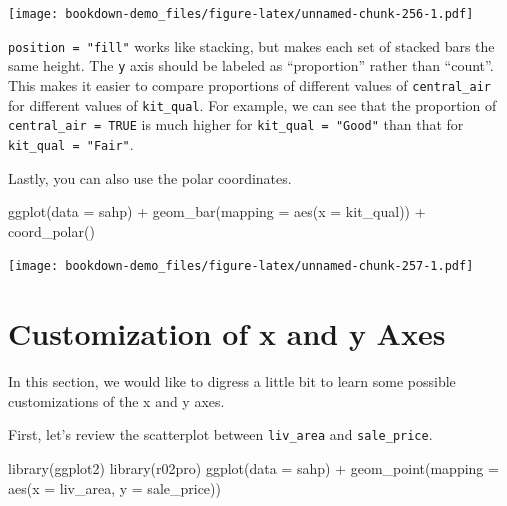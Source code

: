 \documentclass[
]{book}
\newenvironment{Shaded}{\begin{snugshade}}{\end{snugshade}}
\newcommand{\AttributeTok}[1]{\textcolor[rgb]{0.77,0.63,0.00}{#1}}
\newcommand{\FunctionTok}[1]{\textcolor[rgb]{0.00,0.00,0.00}{#1}}
\newcommand{\NormalTok}[1]{#1}
\newcommand{\SpecialCharTok}[1]{\textcolor[rgb]{0.00,0.00,0.00}{#1}}
\begin{document}
\texttt{[image: bookdown-demo\_files/figure-latex/unnamed-chunk-256-1.pdf]}

\texttt{position\ =\ "fill"} works like stacking, but makes each set of stacked bars the same height. The \texttt{y} axis should be labeled as ``proportion'' rather than ``count''. This makes it easier to compare proportions of different values of \texttt{central\_air} for different values of \texttt{kit\_qual}. For example, we can see that the proportion of \texttt{central\_air\ =\ TRUE} is much higher for \texttt{kit\_qual\ =\ "Good"} than that for \texttt{kit\_qual\ =\ "Fair"}.

Lastly, you can also use the polar coordinates.

\begin{Shaded}
\begin{Highlighting}[]
\FunctionTok{ggplot}\NormalTok{(}\AttributeTok{data =}\NormalTok{ sahp) }\SpecialCharTok{+} \FunctionTok{geom\_bar}\NormalTok{(}\AttributeTok{mapping =} \FunctionTok{aes}\NormalTok{(}\AttributeTok{x =}\NormalTok{ kit\_qual)) }\SpecialCharTok{+} \FunctionTok{coord\_polar}\NormalTok{()}
\end{Highlighting}
\end{Shaded}

\texttt{[image: bookdown-demo\_files/figure-latex/unnamed-chunk-257-1.pdf]}

\hypertarget{customization-axes}{%
\section{Customization of x and y Axes}\label{customization-axes}}

In this section, we would like to digress a little bit to learn some possible customizations of the x and y axes.

First, let's review the scatterplot between \texttt{liv\_area} and \texttt{sale\_price}.

\begin{Shaded}
\begin{Highlighting}[]
\FunctionTok{library}\NormalTok{(ggplot2)}
\FunctionTok{library}\NormalTok{(r02pro)}
\FunctionTok{ggplot}\NormalTok{(}\AttributeTok{data =}\NormalTok{ sahp) }\SpecialCharTok{+} \FunctionTok{geom\_point}\NormalTok{(}\AttributeTok{mapping =} \FunctionTok{aes}\NormalTok{(}\AttributeTok{x =}\NormalTok{ liv\_area, }\AttributeTok{y =}\NormalTok{ sale\_price))}
\end{Highlighting}
\end{Shaded}
\end{document}
